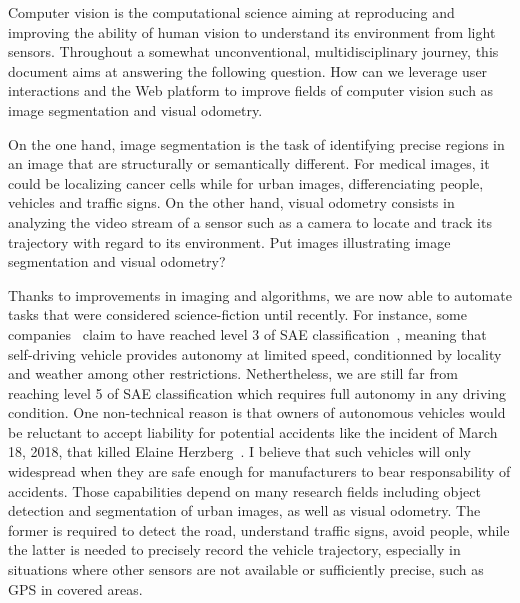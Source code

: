 Computer vision is the computational science aiming at reproducing and improving
the ability of human vision to understand its environment from light sensors.
Throughout a somewhat unconventional, multidisciplinary journey,
this document aims at answering the following question.
How can we leverage user interactions and the Web platform to improve
fields of computer vision such as image segmentation and visual odometry.

On the one hand, image segmentation is the task of identifying precise regions
in an image that are structurally or semantically different.
For medical images, it could be localizing cancer cells while
for urban images, differenciating people, vehicles and traffic signs.
On the other hand, visual odometry consists in analyzing the video stream of a sensor
such as a camera to locate and track its trajectory with regard to its environment.
\alert{Put images illustrating image segmentation and visual odometry?}

Thanks to improvements in imaging and algorithms,
we are now able to automate tasks that were considered science-fiction until recently.
For instance, some companies~\cite{audia8} claim to have reached level 3
of SAE classification~\cite{sae-cars},
meaning that self-driving vehicle provides autonomy at limited speed,
conditionned by locality and weather among other restrictions.
Nethertheless, we are still far from reaching level 5 of SAE classification
which requires full autonomy in any driving condition.
One non-technical reason is that owners of autonomous vehicles would be reluctant
to accept liability for potential accidents like the incident
of March 18, 2018, that killed Elaine Herzberg~\cite{elaineherzberg}.
I believe that such vehicles will only widespread when they are
safe enough for manufacturers to bear responsability of accidents.
Those capabilities depend on many research fields
including object detection and segmentation of urban images,
as well as visual odometry.
The former is required to detect the road, understand traffic signs,
avoid people, while the latter is needed to precisely record
the vehicle trajectory, especially in situations where other sensors
are not available or sufficiently precise, such as GPS in covered areas.

